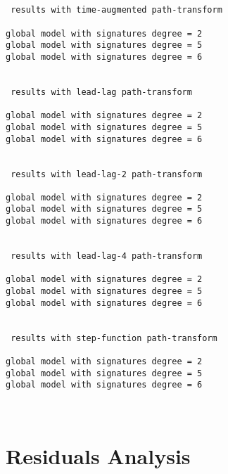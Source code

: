 \documentclass[11pt]{article}
\begin{document}
    \begin{Verbatim}[commandchars=\\\{\}]

 
 results with time-augmented path-transform 

global model with signatures degree = 2
global model with signatures degree = 5
global model with signatures degree = 6

 
 results with lead-lag path-transform 

global model with signatures degree = 2
global model with signatures degree = 5
global model with signatures degree = 6

 
 results with lead-lag-2 path-transform 

global model with signatures degree = 2
global model with signatures degree = 5
global model with signatures degree = 6

 
 results with lead-lag-4 path-transform 

global model with signatures degree = 2
global model with signatures degree = 5
global model with signatures degree = 6

 
 results with step-function path-transform 

global model with signatures degree = 2
global model with signatures degree = 5
global model with signatures degree = 6

    \end{Verbatim}

    \begin{center}
    \end{center}
    { \hspace*{\fill} \\}
    
    \section{Residuals Analysis}\label{residuals-analysis}
\end{document}
